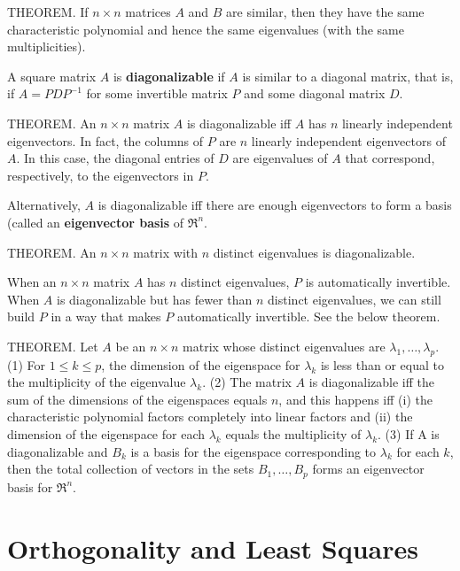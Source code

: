 \documentclass{article}
\begin{document}
\hfill \newline THEOREM. If $n \times n$ matrices $A$ and $B$ are similar, then they have the same characteristic polynomial and hence the same eigenvalues (with the same multiplicities).

\hfill \newline A square matrix $A$ is \textbf{diagonalizable} if $A$ is similar to a diagonal matrix, that is, if $A=PDP^{-1}$ for some invertible matrix $P$ and some diagonal matrix $D$.

\hfill \newline THEOREM. An $n \times n$ matrix $A$ is diagonalizable iff $A$ has $n$ linearly independent eigenvectors. In fact,  the columns of $P$ are $n$ linearly independent eigenvectors of $A$. In this case, the diagonal entries of $D$ are eigenvalues of $A$ that correspond, respectively, to the eigenvectors in $P$.

\hfill \newline Alternatively, $A$ is diagonalizable iff there are enough eigenvectors to form a basis (called an \textbf{eigenvector basis} of $\Re^n$.

\hfill \newline THEOREM. An $n \times n$ matrix with $n$ distinct eigenvalues is diagonalizable.

\hfill \newline When an $n \times n$ matrix $A$ has $n$ distinct eigenvalues, $P$ is automatically invertible. When $A$ is diagonalizable but has fewer than $n$ distinct eigenvalues, we can still build $P$ in a way that makes $P$ automatically invertible. See the below theorem.

\hfill \newline THEOREM. Let $A$ be an $n \times n$ matrix whose distinct eigenvalues are $\lambda_1,\dots,\lambda_p$. (1) For $1 \leq k \leq p$, the dimension of the eigenspace for $\lambda_k$ is less than or equal to the multiplicity of the eigenvalue $\lambda_k$. (2) The matrix $A$ is diagonalizable iff the sum of the dimensions of the eigenspaces equals $n$, and this happens iff (i) the characteristic polynomial factors completely into linear factors and (ii) the dimension of the eigenspace for each $\lambda_k$ equals the multiplicity of $\lambda_k$. (3) If A is diagonalizable and $B_k$ is a basis for the eigenspace corresponding to $\lambda_k$ for each $k$, then the total collection of vectors in the sets $B_1,\dots,B_p$ forms an eigenvector basis for $\Re^n$.

\section{Orthogonality and Least Squares}
\end{document}
